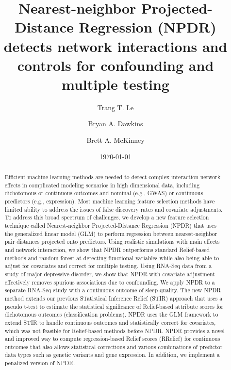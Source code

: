 \documentclass[10pt]{article}
\title{Nearest-neighbor Projected-Distance Regression (NPDR) detects network interactions and controls for confounding and multiple testing}
\author[1]{Trang T. Le}
\author[2]{Bryan A. Dawkins}
\author[2,3*]{Brett A. McKinney}
\affil[1]{Department of Biostatistics, Epidemiology and Informatics,
University of Pennsylvania, Philadelphia, PA 19104}
\affil[2]{Department of Mathematics, University of Tulsa, Tulsa, OK 74104}
\affil[3]{Tandy School of Computer Science, University of Tulsa, Tulsa, OK 74104}
\date{\today}
\begin{document}

\maketitle
\begin{abstract}

Efficient machine learning methods are needed to detect complex interaction network effects in complicated modeling scenarios in high dimensional data, including dichotomous or continuous outcomes and nominal (e.g., GWAS) or continuous predictors (e.g., expression). Most machine learning feature selection methods have limited ability to address the issues of false discovery rates and covariate adjustments. To address this broad spectrum of challenges, we develop a new feature selection technique called Nearest-neighbor Projected-Distance Regression (NPDR) that uses the generalized linear model (GLM) to perform regression between nearest-neighbor pair distances projected onto predictors. Using realistic simulations with main effects and network interaction, we show that NPDR outperforms standard Relief-based methods and random forest at detecting functional variables while also being able to adjust for covariates and correct for multiple testing. Using RNA-Seq data from a study of major depressive disorder, we show that NPDR with covariate adjustment effectively removes spurious associations due to confounding. We apply NPDR to a separate RNA-Seq study with a continuous outcome of sleep quality. The new NPDR method extends our previous STatistical Inference Relief (STIR) approach that uses a pseudo t-test to estimate the statistical significance of Relief-based attribute scores for dichotomous outcomes (classification problems). NPDR uses the GLM framework to extend STIR to handle continuous outcomes and statistically correct for covariates, which was not feasible for Relief-based methods before NPDR. NPDR provides a novel and improved way to compute regression-based Relief scores (RRelief) for continuous outcomes that also allows statistical corrections and various combinations of predictor data types such as genetic variants and gene expression. In addition, we implement a penalized version of NPDR. 

\end{abstract}
\end{document}
